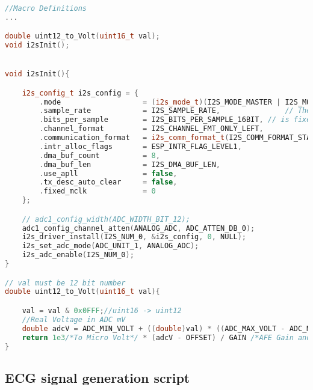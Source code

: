 \begin{lstlisting}[language=C++, caption=ADC.h]

//Macro Definitions
... 

double uint12_to_Volt(uint16_t val);
void i2sInit();


void i2sInit(){

    i2s_config_t i2s_config = {
        .mode                   = (i2s_mode_t)(I2S_MODE_MASTER | I2S_MODE_RX | I2S_MODE_ADC_BUILT_IN),
        .sample_rate            = I2S_SAMPLE_RATE,               // The format of the signal using ADC_BUILT_IN
        .bits_per_sample        = I2S_BITS_PER_SAMPLE_16BIT, // is fixed at 12bit, stereo, MSB
        .channel_format         = I2S_CHANNEL_FMT_ONLY_LEFT,
        .communication_format   = i2s_comm_format_t(I2S_COMM_FORMAT_STAND_I2S),//I2S_COMM_FORMAT_I2S_MSB,
        .intr_alloc_flags       = ESP_INTR_FLAG_LEVEL1,
        .dma_buf_count          = 8,
        .dma_buf_len            = I2S_DMA_BUF_LEN,
        .use_apll               = false,
        .tx_desc_auto_clear     = false,
        .fixed_mclk             = 0
    };

    // adc1_config_width(ADC_WIDTH_BIT_12);
    adc1_config_channel_atten(ANALOG_ADC, ADC_ATTEN_DB_0);
    i2s_driver_install(I2S_NUM_0, &i2s_config, 0, NULL);
    i2s_set_adc_mode(ADC_UNIT_1, ANALOG_ADC);
    i2s_adc_enable(I2S_NUM_0);
}

// val must be 12 bit number
double uint12_to_Volt(uint16_t val){

    val = val & 0x0FFF;//uint16 -> uint12
    //Real Voltage in ADC mV
    double adcV = ADC_MIN_VOLT + ((double)val) * ((ADC_MAX_VOLT - ADC_MIN_VOLT) / (double)ADC_MAX);
    return 1e3/*To Micro Volt*/ * (adcV - OFFSET) / GAIN /*AFE Gain and Offset*/;
}
\end{lstlisting}

\subsection{ECG signal generation script}


